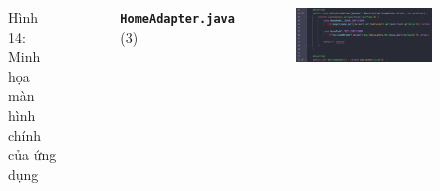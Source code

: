 \documentclass{beamer}
\begin{document}
\begin{frame}
\begin{columns}
\begin{figure}
            \caption{\centering\tiny{Hình 14: Minh họa màn hình chính của ứng dụng}}
        \end{figure}
        \indent \textbf{\texttt{HomeAdapter.java}} (3)
        \begin{figure}
            \centering
            \includegraphics[width=\textwidth]{images/20.png}
        \end{figure}
    \end{columns}
\end{frame}
\end{document}
